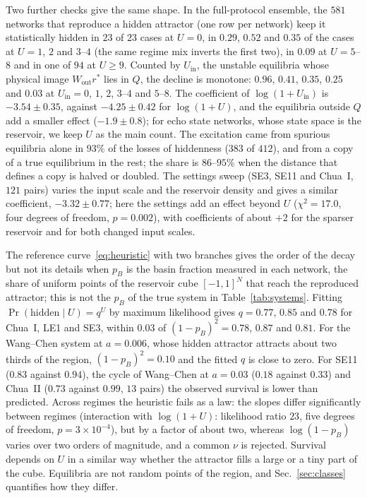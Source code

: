 \documentclass[aip,cha,reprint,amsmath,amssymb,longbibliography]{revtex4-2}
\theoremstyle{definition}
\newcommand{\Uin}{U_{\mathrm{in}}}
\begin{document}
Two further checks give the same shape. In the full-protocol ensemble, the $581$ networks that reproduce a hidden attractor
(one row per network) keep it statistically hidden in $23$ of $23$ cases at $U=0$, in $0.29$, $0.52$ and $0.35$ of the cases at
$U=1$, $2$ and $3$--$4$ (the same regime mix inverts the first two), in $0.09$ at $U=5$--$8$ and in one of $94$ at $U\ge9$.
Counted by $\Uin$, the unstable equilibria whose physical image $W_{\mathrm{out}}r^*$ lies in $Q$, the decline is monotone:
$0.96$, $0.41$, $0.35$, $0.25$ and $0.03$ at $\Uin=0$, $1$, $2$, $3$--$4$ and $5$--$8$. The coefficient of $\log(1+\Uin)$
is $-3.54\pm0.35$, against $-4.25\pm0.42$ for $\log(1+U)$, and the equilibria outside $Q$ add a smaller effect
($-1.9\pm0.8$); for echo state networks, whose state space is the reservoir, we keep $U$ as the main count. The excitation
came from spurious equilibria alone in $93\%$ of the losses of hiddenness ($383$ of $412$), and from a copy of a true
equilibrium in the rest; the share is $86$--$95\%$ when the distance that defines a copy is halved or doubled. The settings
sweep (SE3, SE11 and Chua~I, $121$ pairs) varies the input scale and the reservoir density and gives a similar coefficient,
$-3.32\pm0.77$; here the settings add an effect beyond $U$ ($\chi^2=17.0$, four degrees of freedom, $p=0.002$), with
coefficients of about $+2$ for the sparser reservoir and for both changed input scales.

The reference curve~\eqref{eq:heuristic} with two branches gives the order of the decay but not its details when $p_B$ is
the basin fraction measured in each network, the share of uniform points of the reservoir cube $[-1,1]^N$ that reach the
reproduced attractor; this is not the $p_B$ of the true system in Table~\ref{tab:systems}. Fitting $\Pr(\text{hidden}\mid U)=q^U$ by maximum likelihood gives $q=0.77$, $0.85$ and
$0.78$ for Chua~I, LE1 and SE3, within $0.03$ of $(1-p_B)^2=0.78$, $0.87$ and $0.81$. For the Wang--Chen system at $a=0.006$,
whose hidden attractor attracts about two thirds of the region, $(1-p_B)^2=0.10$ and the fitted $q$ is close to zero. For SE11
($0.83$ against $0.94$), the cycle of Wang--Chen at $a=0.03$ ($0.18$ against $0.33$) and Chua~II ($0.73$ against $0.99$, $13$
pairs) the observed survival is lower than predicted. Across regimes the heuristic fails as a law: the slopes differ
significantly between regimes (interaction with $\log(1+U)$: likelihood ratio $23$, five degrees of freedom, $p=3\times10^{-4}$),
but by a factor of about two, whereas $\log(1-p_B)$ varies over two orders of magnitude, and a common $\nu$ is rejected.
Survival depends on $U$ in a similar way whether the attractor fills a large or a tiny part of the cube. Equilibria are not
random points of the region, and Sec.~\ref{sec:classes} quantifies how they differ.
\end{document}
